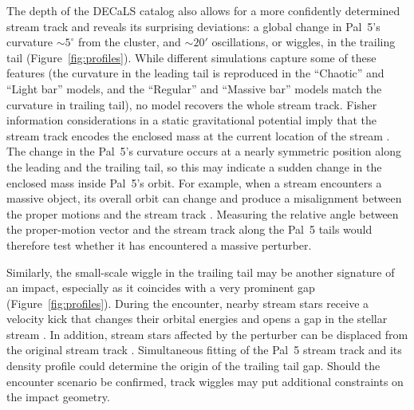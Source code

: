 \documentclass[twocolumn]{aastex62}
\newcommand{\ab}[1]{{\color{teal} AB: #1}}
\newcommand{\sa}[1]{{\color{magenta} SP: #1}}
\begin{document}
The depth of the DECaLS catalog also allows for a more confidently determined stream track and reveals its surprising deviations: a global change in Pal~5's curvature $\sim5^\circ$ from the cluster, and $\sim20'$ oscillations, or wiggles, in the trailing tail (Figure~\ref{fig:profiles}).
While different simulations capture some of these features (the curvature in the leading tail is reproduced in the ``Chaotic'' and ``Light bar'' models, and the ``Regular'' and ``Massive bar'' models match the curvature in trailing tail), no model recovers the whole stream track.
Fisher information considerations in a static gravitational potential imply that the stream track encodes the enclosed mass at the current location of the stream \citep{Bonaca:2018}.
The change in the Pal~5's curvature occurs at a nearly symmetric position along the leading and the trailing tail, so this may indicate a sudden change in the enclosed mass inside Pal~5's orbit.
For example, when a stream encounters a massive object, its overall orbit can change and produce a misalignment between the proper motions and the stream track \citep{Erkal:2018, Koposov:2019}.
Measuring the relative angle between the proper-motion vector and the stream track along the Pal~5 tails would therefore test whether it has encountered a massive perturber.

Similarly, the small-scale wiggle in the trailing tail may be another signature of an impact, especially as it coincides with a very prominent gap (Figure~\ref{fig:profiles}).
During the encounter, nearby stream stars receive a velocity kick that changes their orbital energies and opens a gap in the stellar stream \citep[e.g.,][]{Erkal:2015b}.
In addition, stream stars affected by the perturber can be displaced from the original stream track \citep{Bonaca:2018b}.
Simultaneous fitting of the Pal~5 stream track and its density profile could determine the origin of the trailing tail gap.
Should the encounter scenario be confirmed, track wiggles may put additional constraints on the impact geometry.


\end{document}
